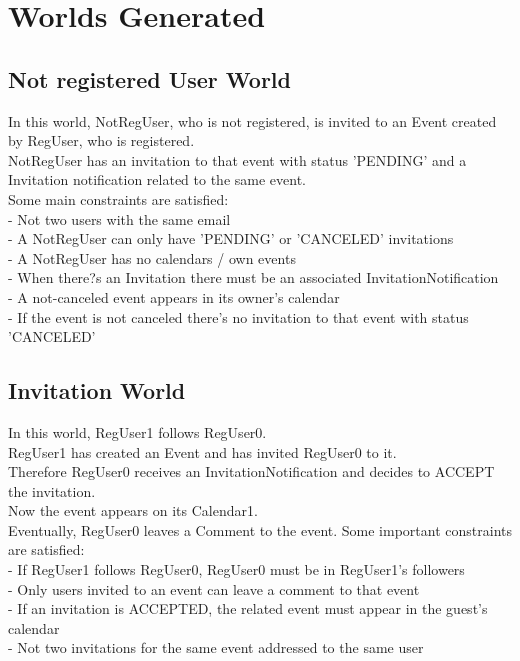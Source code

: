 \documentclass[12pt]{book}
\begin{document}
\chapter{Worlds Generated}
\section{Not registered User World}
In this world, NotRegUser, who is not registered, is invited to an Event  created by RegUser, who is registered.\\
NotRegUser has an invitation to that event with status 'PENDING' and a Invitation notification related to the same event.\\
Some main constraints are satisfied:\\
- Not two users with the same email\\
- A NotRegUser can only have 'PENDING' or 'CANCELED' invitations\\
- A NotRegUser has no calendars / own events\\
- When there?s an Invitation there must be an associated InvitationNotification\\
- A not-canceled event appears in its owner's calendar\\
- If the event is not canceled there's no invitation to that event with status 'CANCELED'\\


\section{Invitation World}
In this world, RegUser1 follows RegUser0.\\
RegUser1 has created an Event and has invited RegUser0 to it.\\
Therefore RegUser0  receives an InvitationNotification and decides to ACCEPT the invitation.\\
Now the event appears on its Calendar1.\\
Eventually, RegUser0 leaves a Comment to the event.
Some important constraints are satisfied:\\
- If RegUser1 follows RegUser0, RegUser0 must be in RegUser1's followers\\
- Only users invited to an event can leave a comment to that event\\
- If an invitation is ACCEPTED, the related event must appear in the guest's calendar\\
- Not two invitations for the same event addressed to the same user\\
\end{document}

